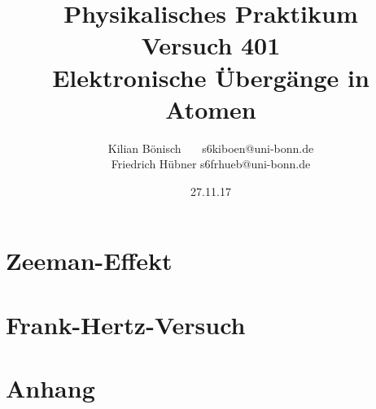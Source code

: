 \documentclass{article}
\newcommand{\RM}[1]{\MakeUppercase{\romannumeral #1}}
\begin{document}
\setlength{\parindent}{0em}   %
\title{Physikalisches Praktikum \RM{4}\\Versuch 401\\Elektronische Übergänge in Atomen}
\author{Kilian Bönisch \ \ \ \qquad s6kiboen@uni-bonn.de \\
  Friedrich Hübner \qquad s6frhueb@uni-bonn.de }
\date{27.11.17}

\maketitle

\newpage

\thispagestyle{empty}

\tableofcontents

\newpage



\section{Zeeman-Effekt}




\section{Frank-Hertz-Versuch}







\section{Anhang}
%

\FloatBarrier
\printbibliography

\newpage
\end{document}
